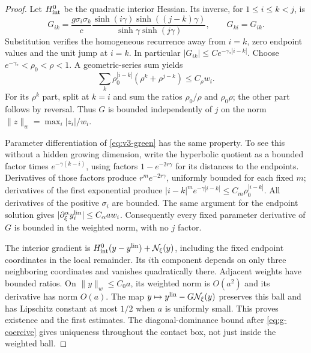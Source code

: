\begin{proof}
Let $H^0_{\rm int}$ be the quadratic interior Hessian. Its inverse,
for $1\le i\le k<j$, is
\begin{equation}\label{eq:v3-green}
 G_{ik}=\frac{g\sigma_i\sigma_k}{c}
 \frac{\sinh(i\gamma)\sinh((j-k)\gamma)}
      {\sinh\gamma\sinh(j\gamma)},\qquad G_{ki}=G_{ik}.
\end{equation}
Substitution verifies the homogeneous recurrence away from $i=k$,
zero endpoint values and the unit jump at $i=k$. In particular
$|G_{ik}|\le Ce^{-\gamma_*|i-k|}$.
Choose $e^{-\gamma_*}<\rho_0<\rho<1$. A geometric-series sum yields
\begin{equation}\label{eq:v3-weighted-green}
 \sum_k\rho_0^{|i-k|}(\rho^k+\rho^{j-k})\le C_\rho w_i.
\end{equation}
For its $\rho^k$ part, split at $k=i$ and sum the ratios
$\rho_0/\rho$ and $\rho_0\rho$; the other part follows by reversal.
Thus $G$ is bounded independently of $j$ on the norm
$\|z\|_w=\max_i|z_i|/w_i$.

Parameter differentiation of \eqref{eq:v3-green} has the same property.
To see this without a hidden growing dimension, write the hyperbolic
quotient as a bounded factor times $e^{-\gamma(k-i)}$, using factors
$1-e^{-2r\gamma}$ for its distances to the endpoints. Derivatives
of those factors produce $r^m e^{-2r\gamma}$, uniformly bounded for
each fixed $m$; derivatives of the first exponential produce
$|i-k|^m e^{-\gamma|i-k|}\le C_m\rho_0^{|i-k|}$.
All derivatives of the positive $\sigma_i$ are bounded. The same
argument for the endpoint solution gives
$|\partial_\xi^\alpha y_i^{\rm lin}|\le C_\alpha a w_i$.
Consequently every fixed parameter derivative of $G$ is bounded in
the weighted norm, with no $j$ factor.

The interior gradient is $H^0_{\rm int}(y-y^{\rm lin})+
\mathcal N_\xi(y)$, including the fixed endpoint coordinates in the
local remainder. Its $i$th component depends on only three neighboring
coordinates and vanishes quadratically there. Adjacent weights have
bounded ratios. On $\|y\|_w\le C_0a$, its weighted norm is
$O(a^2)$ and its derivative has norm $O(a)$. The map
$y\mapsto y^{\rm lin}-G\mathcal N_\xi(y)$ preserves this ball
and has Lipschitz constant at most $1/2$ when $a$ is uniformly small.
This proves existence and the first estimates. The diagonal-dominance
bound after \eqref{eq:g-coercive} gives uniqueness throughout the
contact box, not just inside the weighted ball.


\end{proof}
